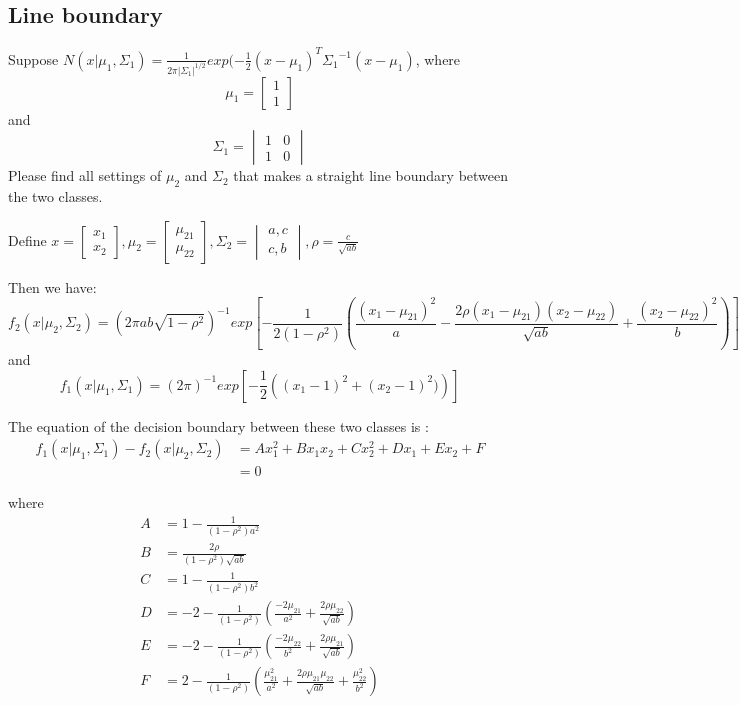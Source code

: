 \documentclass{article}
\newenvironment{answer}{\par\color{ForestGreen}}{\par}
\begin{document}
\subsection{Line boundary}
Suppose $N(x|\mu_1, \Sigma_1) = \frac{1}{{2\pi|\Sigma_1|}^{1/2}}exp{(-\frac{1}{2} (x - \mu_1)^T{\Sigma_1}^{-1}(x - \mu_1)}$, where
$$\mu_1 = \begin{bmatrix}1 \\ 1\end{bmatrix} $$
and $$\Sigma_1 = \begin{vmatrix}1 & 0 \\ 1 &0\end{vmatrix} $$
Please find all settings of $\mu_2$ and $\Sigma_2$ that makes a straight line boundary between the two classes.
\begin{answer}
    Define $x = \begin{bmatrix} x_1 \\ x_2\end{bmatrix}, \mu_2 = \begin{bmatrix} \mu_{21} \\ \mu_{22}\end{bmatrix},\Sigma_2 = \begin{vmatrix} a, c \\ c, b\end{vmatrix}, \rho=\frac{c}{\sqrt{ab}}$

    Then we have:
    $$f_2(x|\mu_2,\Sigma_2) = (2\pi ab\sqrt{1-\rho^2})^{-1}exp[-\frac{1}{2(1-\rho^2)}\left(\frac{(x_1-\mu_{21})^2}{a} - \frac{2\rho(x_1-\mu_{21})(x_2-\mu_{22})}{\sqrt{ab}} + \frac{(x_2-\mu_{22})^2}{b}\right)]$$
    and
    $$f_1(x|\mu_1,\Sigma_1) = (2\pi)^{-1}exp[-\frac{1}{2}\left((x_1-1)^2 + (x_2-1)^2)\right)]$$

    The equation of the decision boundary between these two classes is :
    \begin{align*} f_1(x|\mu_1,\Sigma_1) - f_2(x|\mu_2,\Sigma_2)  & = Ax_1^2 + Bx_1x_2 + Cx_2^2 + Dx_1 + Ex_2 + F \\
                    & = 0
     \end{align*}

     where \begin{align*} A & = 1 - \frac{1}{(1-\rho^2)a^2}  \\
                          B & = \frac{2\rho}{(1-\rho^2)\sqrt{ab}}  \\
                          C & = 1 - \frac{1}{(1-\rho^2)b^2}  \\
                          D & = -2 - \frac{1}{(1-\rho^2)}\left(\frac{-2\mu_{21}}{a^2} + \frac{2\rho\mu_{22}}{\sqrt{ab}}\right) \\
                          E & = -2 - \frac{1}{(1-\rho^2)}\left(\frac{-2\mu_{22}}{b^2} + \frac{2\rho\mu_{21}}{\sqrt{ab}}\right) \\
                          F & = 2 - \frac{1}{(1-\rho^2)}\left(\frac{\mu_{21}^2}{a^2} + \frac{2\rho\mu_{21}\mu_{22}}{\sqrt{ab}} + \frac{\mu_{22}^2}{b^2}\right)
      \end{align*}


\end{answer}
\end{document}
